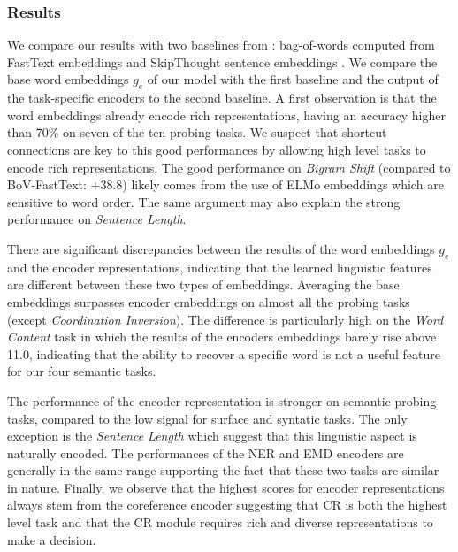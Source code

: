 \documentclass[letterpaper]{article}
\begin{document}
\subsubsection*{Results}

We compare our results with two baselines from \cite{Conneau2018}: bag-of-words computed from FastText embeddings and SkipThought sentence embeddings \cite{kiros2015skip}. We compare the base word embeddings $g_{e}$ of our model with the first baseline and the output of the task-specific encoders to the second baseline. A first observation is that the word embeddings already encode rich representations, having an accuracy higher than 70\% on seven of the ten probing tasks. We suspect that shortcut connections are key to this good performances by allowing high level tasks to encode rich representations. The good performance on \textit{Bigram Shift} (compared to BoV-FastText: +38.8) likely comes from the use of ELMo embeddings which are sensitive to word order. The same argument may also explain the strong performance on \textit{Sentence Length}.

There are significant discrepancies between the results of the word embeddings $g_{e}$ and the encoder representations, indicating that the learned linguistic features are different between these two types of embeddings. Averaging the base embeddings surpasses encoder embeddings on almost all the probing tasks (except \textit{Coordination Inversion}). The difference is particularly high on the \textit{Word Content} task in which the results of the encoders embeddings barely rise above 11.0, indicating that the ability to recover a specific word is not a useful feature for our four semantic tasks.

The performance of the encoder representation is stronger on semantic probing tasks, compared to the low signal for surface and syntatic tasks. The only exception is the \textit{Sentence Length} which suggest that this linguistic aspect is naturally encoded. The performances of the NER and EMD encoders are generally in the same range supporting the fact that these two tasks are similar in nature. Finally, we observe that the highest scores for encoder representations always stem from the coreference encoder suggesting that CR is both the highest level task and that the CR module requires rich and diverse representations to make a decision.
\end{document}
